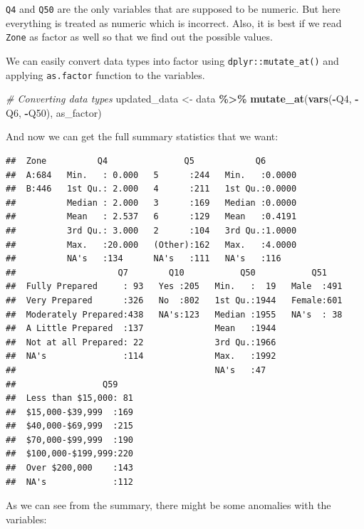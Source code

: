 \documentclass[
]{book}
\newenvironment{Shaded}{\begin{snugshade}}{\end{snugshade}}
\newcommand{\CommentTok}[1]{\textcolor[rgb]{0.56,0.35,0.01}{\textit{#1}}}
\newcommand{\KeywordTok}[1]{\textcolor[rgb]{0.13,0.29,0.53}{\textbf{#1}}}
\newcommand{\NormalTok}[1]{#1}
\newcommand{\OperatorTok}[1]{\textcolor[rgb]{0.81,0.36,0.00}{\textbf{#1}}}
\newcommand{\StringTok}[1]{\textcolor[rgb]{0.31,0.60,0.02}{#1}}
\begin{document}
\texttt{Q4} and \texttt{Q50} are the only variables that are supposed to be numeric. But here everything is treated as numeric which is incorrect. Also, it is best if we read \texttt{Zone} as factor as well so that we find out the possible values.

We can easily convert data types into factor using \texttt{dplyr::mutate\_at()} and applying \texttt{as.factor} function to the variables.

\begin{Shaded}
\begin{Highlighting}[]
\CommentTok{\# Converting data types}
\NormalTok{updated\_data \textless{}{-}}\StringTok{ }\NormalTok{data }\OperatorTok{\%\textgreater{}\%}\StringTok{ }\KeywordTok{mutate\_at}\NormalTok{(}\KeywordTok{vars}\NormalTok{(}\OperatorTok{{-}}\NormalTok{Q4, }\OperatorTok{{-}}\NormalTok{Q6, }\OperatorTok{{-}}\NormalTok{Q50), as\_factor)}
\end{Highlighting}
\end{Shaded}

And now we can get the full summary statistics that we want:

\begin{verbatim}
##  Zone          Q4               Q5            Q6        
##  A:684   Min.   : 0.000   5      :244   Min.   :0.0000  
##  B:446   1st Qu.: 2.000   4      :211   1st Qu.:0.0000  
##          Median : 2.000   3      :169   Median :0.0000  
##          Mean   : 2.537   6      :129   Mean   :0.4191  
##          3rd Qu.: 3.000   2      :104   3rd Qu.:1.0000  
##          Max.   :20.000   (Other):162   Max.   :4.0000  
##          NA's   :134      NA's   :111   NA's   :116     
##                    Q7        Q10           Q50           Q51     
##  Fully Prepared     : 93   Yes :205   Min.   :  19   Male  :491  
##  Very Prepared      :326   No  :802   1st Qu.:1944   Female:601  
##  Moderately Prepared:438   NA's:123   Median :1955   NA's  : 38  
##  A Little Prepared  :137              Mean   :1944               
##  Not at all Prepared: 22              3rd Qu.:1966               
##  NA's               :114              Max.   :1992               
##                                       NA's   :47                 
##                 Q59     
##  Less than $15,000: 81  
##  $15,000-$39,999  :169  
##  $40,000-$69,999  :215  
##  $70,000-$99,999  :190  
##  $100,000-$199,999:220  
##  Over $200,000    :143  
##  NA's             :112
\end{verbatim}

As we can see from the summary, there might be some anomalies with the variables:
\end{document}
